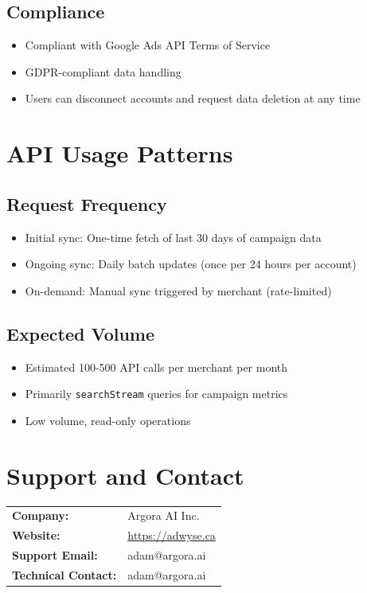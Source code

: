 \documentclass[11pt,a4paper]{article}
\begin{document}
\subsection{Compliance}
\begin{itemize}
    \item Compliant with Google Ads API Terms of Service
    \item GDPR-compliant data handling
    \item Users can disconnect accounts and request data deletion at any time
\end{itemize}

\section{API Usage Patterns}

\subsection{Request Frequency}
\begin{itemize}
    \item Initial sync: One-time fetch of last 30 days of campaign data
    \item Ongoing sync: Daily batch updates (once per 24 hours per account)
    \item On-demand: Manual sync triggered by merchant (rate-limited)
\end{itemize}

\subsection{Expected Volume}
\begin{itemize}
    \item Estimated 100-500 API calls per merchant per month
    \item Primarily \texttt{searchStream} queries for campaign metrics
    \item Low volume, read-only operations
\end{itemize}

\section{Support and Contact}

\begin{tabular}{ll}
\textbf{Company:} & Argora AI Inc. \\
\textbf{Website:} & \url{https://adwyse.ca} \\
\textbf{Support Email:} & adam@argora.ai \\
\textbf{Technical Contact:} & adam@argora.ai \\
\end{tabular}
\end{document}
